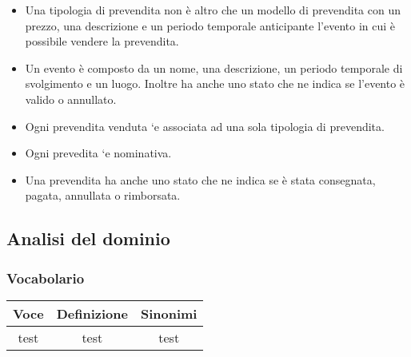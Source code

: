 \documentclass{article}
\begin{document}
\begin{itemize}
    
    \item Una tipologia di prevendita non è altro che un modello di prevendita con un prezzo, una descrizione e un periodo temporale anticipante l'evento in cui è possibile vendere la prevendita.
    
    \item Un evento è composto da un nome, una descrizione, un periodo temporale di svolgimento e un luogo. Inoltre ha anche uno stato che ne indica se l'evento è valido o annullato.
    
    \item Ogni prevendita venduta `e associata ad una sola tipologia di prevendita.
    \item Ogni prevedita `e nominativa.
    \item Una prevendita ha anche uno stato che ne indica se è stata consegnata, pagata, annullata o rimborsata.
    
    
\end{itemize}

\newpage

\subsection{Analisi del dominio}

\subsubsection{Vocabolario}

\begin{center}
    \begin{tabular}{|c|c|c|}
        \hline
        \textbf{Voce} & \textbf{Definizione} & \textbf{Sinonimi} \\
        \hline\hline
        test & test & test \\
        \hline
    \end{tabular}
\end{center}

\end{document}
